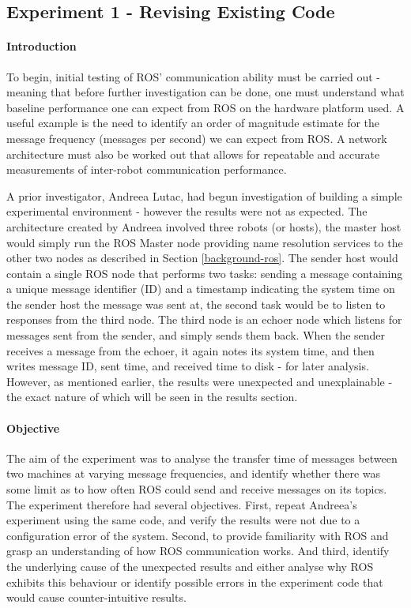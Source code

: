 \documentclass[../dissertation.tex]{subfiles}
\begin{document}
\subsection{Experiment 1 - Revising Existing Code}
\label{exp-1}

\paragraph{Introduction} To begin, initial testing of ROS' communication ability must be carried out - meaning that before further investigation can be done, one must understand what baseline performance one can expect from ROS on the hardware platform used. A useful example is the need to identify an order of magnitude estimate for the message frequency (messages per second) we can expect from ROS. A network architecture must also be worked out that allows for repeatable and accurate measurements of inter-robot communication performance.

A prior investigator, Andreea Lutac\cite{andreeaLutacBlog}, had begun investigation of building a simple experimental environment - however the results were not as expected. The architecture created by Andreea involved three robots (or hosts), the master host would simply run the ROS Master node providing name resolution services to the other two nodes as described in Section \ref{background-ros}. The sender host would contain a single ROS node that performs two tasks: sending a message containing a unique message identifier (ID) and a timestamp indicating the system time on the sender host the message was sent at, the second task would be to listen to responses from the third node. The third node is an echoer node which listens for messages sent from the sender, and simply sends them back. When the sender receives a message from the echoer, it again notes its system time, and then writes message ID, sent time, and received time to disk - for later analysis. However, as mentioned earlier, the results were unexpected and unexplainable - the exact nature of which will be seen in the results section.

\paragraph{Objective} The aim of the experiment was to analyse the transfer time of messages between two machines at varying message frequencies, and identify whether there was some limit as to how often ROS could send and receive messages on its topics. The experiment therefore had several objectives. First, repeat Andreea's experiment using the same code\cite{Experiment1InitialCode}, and verify the results were not due to a configuration error of the system. Second, to provide familiarity with ROS and grasp an understanding of how ROS communication works. And third, identify the underlying cause of the unexpected results and either analyse why ROS exhibits this behaviour or identify possible errors in the experiment code that would cause counter-intuitive results.
\end{document}
